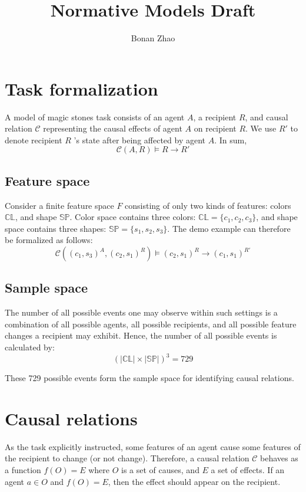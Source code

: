 \documentclass{article}
\title{Normative Models Draft}
\author{Bonan Zhao}
\newcommand{\featurespace}{F}
\newcommand{\colorspace}{\mathbb{CL}}
\newcommand{\shapespace}{\mathbb{SP}}
\begin{document}
\maketitle

\section{Task formalization}

A model of magic stones task consists of an agent $A$, a recipient $R$, and causal relation $\mathcal{C}$ representing the causal effects of agent $A$ on recipient $R$. We use $R'$ to denote recipient $R$ 's state after being affected by agent $A$. In sum, 
%
$$
\mathcal{C}(A, R) \models R \rightarrow R'$$

\subsection*{Feature space}

Consider a finite feature space $\featurespace$ consisting of only two kinds of features: colors $\colorspace$, and shape $\shapespace$. Color space contains three colors: $\colorspace = \{ c_1, c_2,  c_3 \}$, and shape space contains three shapes: $\shapespace = \{ s_1, s_2, s_3 \}$. The demo example can therefore be formalized as follows:
%
$$\mathcal{C}((c_1, s_3)^A, (c_2, s_1)^R) \models (c_2, s_1)^R \rightarrow (c_1, s_1)^{R'}
$$


\subsection*{Sample space}

The number of all possible events one may observe within such settings is a combination of all possible agents, all possible recipients, and all possible feature changes a recipient may exhibit. Hence, the number of all possible events is calculated by:
%
$$(|\colorspace| \times |\shapespace|)^3 = 729$$
	
These 729 possible events form the sample space for identifying causal relations. 

\section{Causal relations}

As the task explicitly instructed, some features of an agent cause some features of the recipient to change (or not change). 
%
Therefore, a causal relation $\mathcal{C}$ behaves as a function $f(O) = E$ where $O$ is a set of causes, and $E$ a set of effects. If an agent $a \in O$ and $f(O) = E$, then the effect should appear on the recipient.
\end{document}
